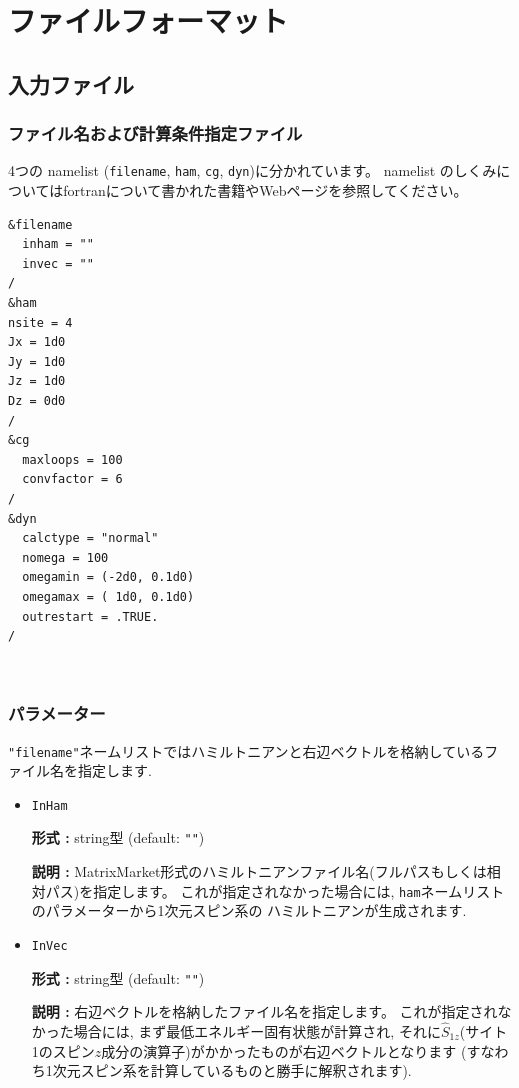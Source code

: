 \documentclass[12pt,titlepage]{jarticle}
\begin{document}
\newpage
\section{ファイルフォーマット}\label{Sec:FileFormat}

\subsection{入力ファイル}

\subsubsection{ファイル名および計算条件指定ファイル}\label{Sec:ModPara}
4つの namelist (\verb|filename|, \verb|ham|, \verb|cg|, \verb|dyn|)に分かれています。
namelist のしくみについてはfortranについて書かれた書籍やWebページを参照してください。
\\
\begin{minipage}{15cm}
\begin{screen}
\begin{verbatim}
&filename
  inham = ""
  invec = ""
/
&ham
nsite = 4
Jx = 1d0
Jy = 1d0
Jz = 1d0
Dz = 0d0
/
&cg
  maxloops = 100
  convfactor = 6
/
&dyn
  calctype = "normal"
  nomega = 100
  omegamin = (-2d0, 0.1d0)
  omegamax = ( 1d0, 0.1d0)
  outrestart = .TRUE.
/
\end{verbatim}
\end{screen}
\end{minipage}
\\

\subsubsection{パラメーター}

\verb|"filename"|ネームリストではハミルトニアンと右辺ベクトルを格納しているファイル名を指定します.

\begin{itemize}
\item \verb|InHam|
  
  {\bf 形式 :} string型 (default: \verb|""|)
  
  {\bf 説明 :} MatrixMarket形式のハミルトニアンファイル名(フルパスもしくは相対パス)を指定します。
  これが指定されなかった場合には, \verb|ham|ネームリストのパラメーターから1次元スピン系の
  ハミルトニアンが生成されます.
  
\item \verb|InVec|
  
  {\bf 形式 :} string型 (default: \verb|""|) 

  {\bf 説明 :} 右辺ベクトルを格納したファイル名を指定します。
  これが指定されなかった場合には, まず最低エネルギー固有状態が計算され,
  それに${\hat S}_{1 z}$(サイト1のスピン$z$成分の演算子)がかかったものが右辺ベクトルとなります
  (すなわち1次元スピン系を計算しているものと勝手に解釈されます).

\end{itemize}
\end{document}

